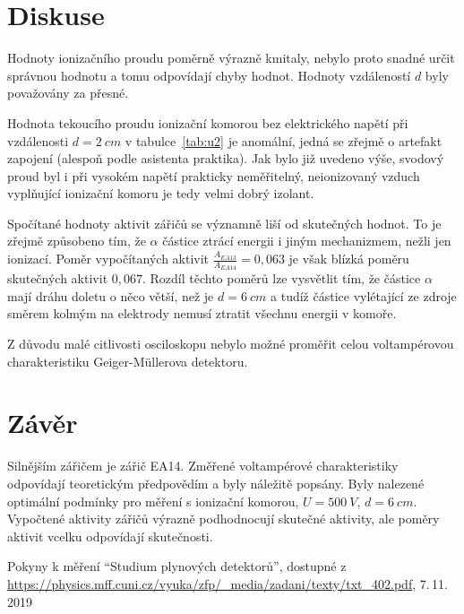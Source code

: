 \documentclass{protokol}
\begin{document}
    \section*{Diskuse}

    Hodnoty ionizačního proudu poměrně výrazně kmitaly, nebylo proto snadné určit správnou hodnotu a tomu odpovídají chyby hodnot.
    Hodnoty vzdáleností $d$ byly považovány za přesné.

    Hodnota tekoucího proudu ionizační komorou bez elektrického napětí při vzdálenosti $d = \SI{2}{cm}$ v tabulce~\ref{tab:u2} je anomální, jedná se zřejmě o artefakt zapojení (alespoň podle asistenta praktika).
    Jak bylo již uvedeno výše, svodový proud byl i při vysokém napětí prakticky neměřitelný, neionizovaný vzduch vyplňující ionizační komoru je tedy velmi dobrý izolant.

    Spočítané hodnoty aktivit zářičů se významně liší od skutečných hodnot.
    To je zřejmě způsobeno tím, že $\alpha$ částice ztrácí energii i jiným mechanizmem, nežli jen ionizací.
    Poměr vypočítaných aktivit $\frac{A_{EA13}}{A_{EA14}} = \si{0,063}$ je však blízká poměru skutečných aktivit $\si{0,067}$.
    Rozdíl těchto poměrů lze vysvětlit tím, že částice $\alpha$ mají dráhu doletu o něco větší, než je $d = \SI{6}{cm}$ a tudíž částice vylétající ze zdroje směrem kolmým na elektrody nemusí ztratit všechnu energii v komoře.
    
    Z důvodu malé citlivosti osciloskopu nebylo možné proměřit celou voltampérovou charakteristiku Geiger-Müllerova detektoru.

    \section*{Závěr}

    Silnějším zářičem je zářič EA14.
    Změřené voltampérové charakteristiky odpovídají teoretickým předpovědím a byly náležitě popsány.
    Byly nalezené optimální podmínky pro měření s ionizační komorou, $U = \SI{500}{V}$, $d = \SI{6}{cm}$.
    Vypočtené aktivity zářičů výrazně podhodnocují skutečné aktivity, ale poměry aktivit vcelku odpovídají skutečnosti.

    \begin{thebibliography}{}

        Pokyny k měření ``Studium plynových detektorů'', dostupné z\\ \url{https://physics.mff.cuni.cz/vyuka/zfp/_media/zadani/texty/txt_402.pdf}, 7.\,11.\,2019

    \end{thebibliography}
\end{document}
